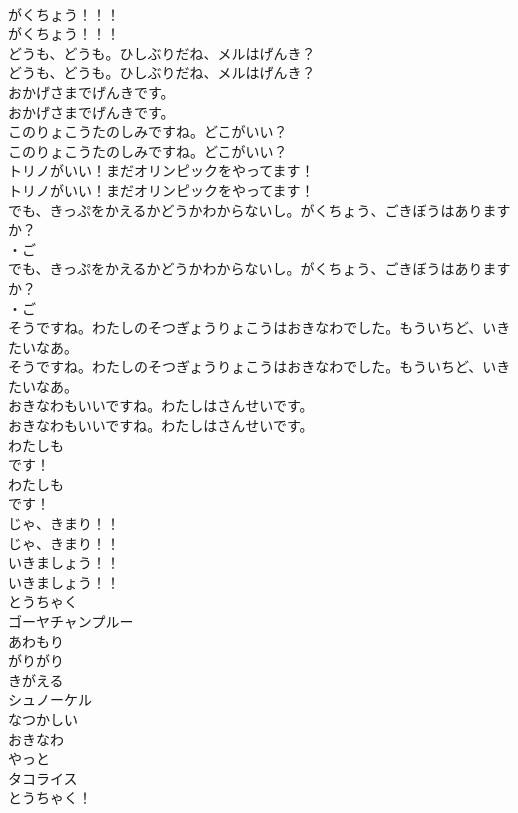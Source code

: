 \documentclass[8pt]{extreport}
\begin{document}
\begin{CJK}{UTF8}{min}
\\	がくちょう！！！	
\\	がくちょう！！！ 
\\	どうも、どうも。ひしぶりだね、メルはげんき？	
\\	どうも、どうも。ひしぶりだね、メルはげんき？ 
\\	おかげさまでげんきです。	
\\	おかげさまでげんきです。 
\\	このりょこうたのしみですね。どこがいい？	
\\	このりょこうたのしみですね。どこがいい？ 
\\	トリノがいい！まだオリンピックをやってます！	
\\	トリノがいい！まだオリンピックをやってます！ 
\\	でも、きっぷをかえるかどうかわからないし。がくちょう、ごきぼうはありますか？	
\\	・ご 
\\	でも、きっぷをかえるかどうかわからないし。がくちょう、ごきぼうはありますか？ 
\\	・ご 
\\	そうですね。わたしのそつぎょうりょこうはおきなわでした。もういちど、いきたいなあ。	
\\	そうですね。わたしのそつぎょうりょこうはおきなわでした。もういちど、いきたいなあ。 
\\	おきなわもいいですね。わたしはさんせいです。	
\\	おきなわもいいですね。わたしはさんせいです。 
\\	わたしも
\\	です！	
\\	わたしも
\\	です！ 
\\	じゃ、きまり！！	
\\	じゃ、きまり！！ 
\\	いきましょう！！	
\\	いきましょう！！ 
\\	とうちゃく
\\	ゴーヤチャンプルー
\\	あわもり
\\	がりがり
\\	きがえる
\\	シュノーケル
\\	なつかしい
\\	おきなわ
\\	やっと
\\	タコライス
\\	とうちゃく！	

\end{CJK}
\end{document}
